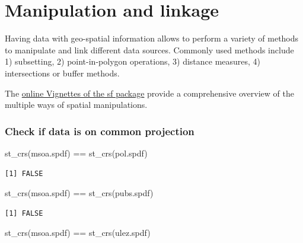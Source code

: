 \documentclass[
  letterpaper,
]{scrbook}
\newenvironment{Shaded}{\begin{snugshade}}{\end{snugshade}}
\newcommand{\FunctionTok}[1]{\textcolor[rgb]{0.28,0.35,0.67}{#1}}
\newcommand{\NormalTok}[1]{\textcolor[rgb]{0.00,0.23,0.31}{#1}}
\newcommand{\SpecialCharTok}[1]{\textcolor[rgb]{0.37,0.37,0.37}{#1}}
\begin{document}
\hypertarget{manipulation-and-linkage}{%
\section{Manipulation and linkage}\label{manipulation-and-linkage}}

Having data with geo-spatial information allows to perform a variety of
methods to manipulate and link different data sources. Commonly used
methods include 1) subsetting, 2) point-in-polygon operations, 3)
distance measures, 4) intersections or buffer methods.

The \href{https://r-spatial.github.io/sf/articles/}{online Vignettes of
the sf package} provide a comprehensive overview of the multiple ways of
spatial manipulations.

\hypertarget{check-if-data-is-on-common-projection}{%
\subsubsection{Check if data is on common
projection}\label{check-if-data-is-on-common-projection}}

\begin{Shaded}
\begin{Highlighting}[]
\FunctionTok{st\_crs}\NormalTok{(msoa.spdf) }\SpecialCharTok{==} \FunctionTok{st\_crs}\NormalTok{(pol.spdf)}
\end{Highlighting}
\end{Shaded}

\begin{verbatim}
[1] FALSE
\end{verbatim}

\begin{Shaded}
\begin{Highlighting}[]
\FunctionTok{st\_crs}\NormalTok{(msoa.spdf) }\SpecialCharTok{==} \FunctionTok{st\_crs}\NormalTok{(pubs.spdf)}
\end{Highlighting}
\end{Shaded}

\begin{verbatim}
[1] FALSE
\end{verbatim}

\begin{Shaded}
\begin{Highlighting}[]
\FunctionTok{st\_crs}\NormalTok{(msoa.spdf) }\SpecialCharTok{==} \FunctionTok{st\_crs}\NormalTok{(ulez.spdf)}
\end{Highlighting}
\end{Shaded}
\end{document}
